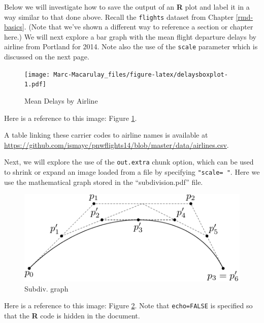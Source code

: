 \documentclass [11pt, proquest] {uwthesis}[2015/03/03]
\newenvironment{Shaded}{}{}
\newcommand{\KeywordTok}[1]{\textcolor[rgb]{0.00,0.44,0.13}{\textbf{{#1}}}}
\newcommand{\DataTypeTok}[1]{\textcolor[rgb]{0.56,0.13,0.00}{{#1}}}
\newcommand{\StringTok}[1]{\textcolor[rgb]{0.25,0.44,0.63}{{#1}}}
\newcommand{\NormalTok}[1]{{#1}}
\newcommand{\OperatorTok}[1]{\textcolor[rgb]{0.00,0.44,0.13}{\textbf{{#1}}}}
\begin{document}
\clearpage 

Below we will investigate how to save the output of an \textbf{R} plot
and label it in a way similar to that done above. Recall the
\texttt{flights} dataset from Chapter \ref{rmd-basics}. (Note that we've
shown a different way to reference a section or chapter here.) We will
next explore a bar graph with the mean flight departure delays by
airline from Portland for 2014. Note also the use of the \texttt{scale}
parameter which is discussed on the next page.
\begin{Shaded}
\end{Shaded}
\begin{figure}
\centering
\texttt{[image: Marc-Macarulay\_files/figure-latex/delaysboxplot-1.pdf]}
\caption{\label{fig:delaysboxplot}Mean Delays by Airline}
\end{figure}
Here is a reference to this image: Figure \ref{fig:delaysboxplot}.

A table linking these carrier codes to airline names is available at
\url{https://github.com/ismayc/pnwflights14/blob/master/data/airlines.csv}.

\clearpage

Next, we will explore the use of the \texttt{out.extra} chunk option,
which can be used to shrink or expand an image loaded from a file by
specifying \texttt{"scale=\ "}. Here we use the mathematical graph
stored in the ``subdivision.pdf'' file.
\begin{figure}
\includegraphics[scale=0.75]{figure/subdivision} \caption{Subdiv. graph}\label{fig:subd}
\end{figure}
Here is a reference to this image: Figure \ref{fig:subd}. Note that
\texttt{echo=FALSE} is specified so that the \textbf{R} code is hidden
in the document.
\end{document}
